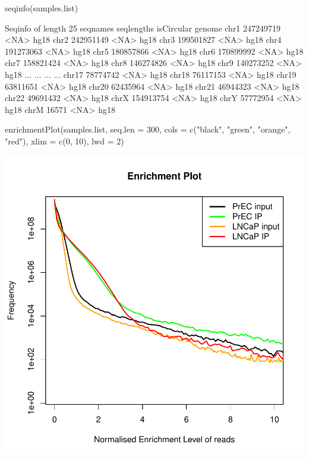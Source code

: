 \begin{Schunk}
\begin{Sinput}
 seqinfo(samples.list)
\end{Sinput}
\begin{Soutput}
Seqinfo of length 25
seqnames seqlengths isCircular genome
chr1      247249719       <NA>   hg18
chr2      242951149       <NA>   hg18
chr3      199501827       <NA>   hg18
chr4      191273063       <NA>   hg18
chr5      180857866       <NA>   hg18
chr6      170899992       <NA>   hg18
chr7      158821424       <NA>   hg18
chr8      146274826       <NA>   hg18
chr9      140273252       <NA>   hg18
...             ...        ...    ...
chr17      78774742       <NA>   hg18
chr18      76117153       <NA>   hg18
chr19      63811651       <NA>   hg18
chr20      62435964       <NA>   hg18
chr21      46944323       <NA>   hg18
chr22      49691432       <NA>   hg18
chrX      154913754       <NA>   hg18
chrY       57772954       <NA>   hg18
chrM          16571       <NA>   hg18
\end{Soutput}
\begin{Sinput}
 enrichmentPlot(samples.list, seq.len = 300,
                cols = c("black", "green", "orange", "red"),
                xlim = c(0, 10), lwd = 2)
\end{Sinput}
\end{Schunk}
\includegraphics{qc-enrPlot}

